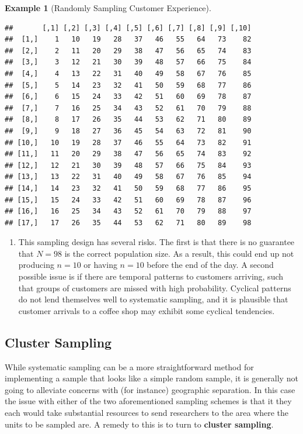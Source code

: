 \documentclass[
  letterpaper,
  DIV=11,
  numbers=noendperiod]{scrreprt}
\providecommand{\tightlist}{%
  \setlength{\itemsep}{0pt}\setlength{\parskip}{0pt}}\usepackage{longtable,booktabs,array}
\theoremstyle{definition}
\theoremstyle{definition}
\newtheorem{example}{Example}[chapter]
\theoremstyle{definition}
\theoremstyle{remark}
\begin{document}
\begin{example}[Randomly Sampling Customer
Experience]
\begin{tcolorbox}[enhanced jigsaw, colback=white, colframe=quarto-callout-color-frame, arc=.35mm, leftrule=.75mm, rightrule=.15mm, opacityback=0, breakable, bottomrule=.15mm, left=2mm, toprule=.15mm]
\begin{verbatim}
##       [,1] [,2] [,3] [,4] [,5] [,6] [,7] [,8] [,9] [,10]
##  [1,]    1   10   19   28   37   46   55   64   73    82
##  [2,]    2   11   20   29   38   47   56   65   74    83
##  [3,]    3   12   21   30   39   48   57   66   75    84
##  [4,]    4   13   22   31   40   49   58   67   76    85
##  [5,]    5   14   23   32   41   50   59   68   77    86
##  [6,]    6   15   24   33   42   51   60   69   78    87
##  [7,]    7   16   25   34   43   52   61   70   79    88
##  [8,]    8   17   26   35   44   53   62   71   80    89
##  [9,]    9   18   27   36   45   54   63   72   81    90
## [10,]   10   19   28   37   46   55   64   73   82    91
## [11,]   11   20   29   38   47   56   65   74   83    92
## [12,]   12   21   30   39   48   57   66   75   84    93
## [13,]   13   22   31   40   49   58   67   76   85    94
## [14,]   14   23   32   41   50   59   68   77   86    95
## [15,]   15   24   33   42   51   60   69   78   87    96
## [16,]   16   25   34   43   52   61   70   79   88    97
## [17,]   17   26   35   44   53   62   71   80   89    98
\end{verbatim}

\begin{enumerate}
\def\labelenumi{\alph{enumi}.}
\setcounter{enumi}{1}
\tightlist
\item
  This sampling design has several risks. The first is that there is no
  guarantee that \(N=98\) is the correct population size. As a result,
  this could end up not producing \(n=10\) or having \(n=10\) before the
  end of the day. A second possible issue is if there are temporal
  patterns to customers arriving, such that groups of customers are
  missed with high probability. Cyclical patterns do not lend themselves
  well to systematic sampling, and it is plausible that customer
  arrivals to a coffee shop may exhibit some cyclical tendencies.
\end{enumerate}

\end{tcolorbox}

\end{example}

\subsection{Cluster Sampling}\label{cluster-sampling}

While systematic sampling can be a more straightforward method for
implementing a sample that looks like a simple random sample, it is
generally not going to alleviate concerns with (for instance) geographic
separation. In this case the issue with either of the two aforementioned
sampling schemes is that it they each would take substantial resources
to send researchers to the area where the units to be sampled are. A
remedy to this is to turn to \textbf{cluster sampling}.
\end{document}
